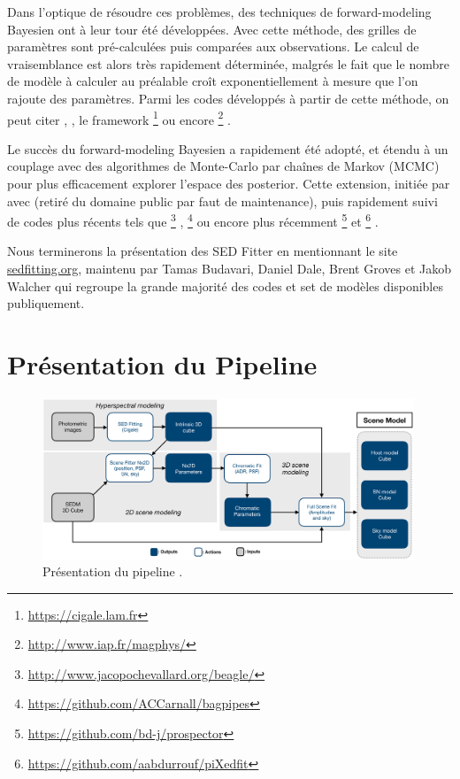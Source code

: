 \documentclass[../main/main.tex]{subfiles}
\begin{document}
Dans l'optique de résoudre ces problèmes, des techniques de forward-modeling
Bayesien ont à leur tour été développées. Avec cette méthode, des
grilles de paramètres sont pré-calculées puis comparées aux
observations. Le calcul de vraisemblance est alors très rapidement
déterminée, malgrés le fait que le nombre de modèle à calculer au
préalable croît exponentiellement à mesure que l'on rajoute des
paramètres. Parmi les codes développés à partir de cette méthode, on peut citer \citet{Kauffman2003}, \citet{Salim2007}, le
framework \footnote{\url{https://cigale.lam.fr}}
\citep{Burgarella2005, Noll2009, Boquien2019} ou encore
\footnote{\url{http://www.iap.fr/magphys/}}
\citep{Cunha2008MAGPHYS}.

Le succès du forward-modeling Bayesien a rapidement été adopté, et
étendu à un couplage avec des algorithmes de Monte-Carlo par chaînes de
Markov (MCMC) pour plus efficacement explorer l'espace des
posterior. Cette extension, initiée par \citet{Acquaviva2011} avec
 (retiré du domaine public par faut de maintenance), puis
rapidement suivi de codes plus récents tels que
\footnote{\url{http://www.jacopochevallard.org/beagle/}}
\citep{Chevallard2016},
\footnote{\url{https://github.com/ACCarnall/bagpipes}}
\citep{Carnall2018, Carnall2019} ou encore plus récemment
\footnote{\url{https://github.com/bd-j/prospector}}
\citep{JohnsonProspector} et
\footnote{\url{https://github.com/aabdurrouf/piXedfit}}
\citep{Abdurro'ufPixedfit}.

Nous terminerons la présentation des SED Fitter en mentionnant le site
\url{sedfitting.org}, maintenu par Tamas Budavari, Daniel Dale, Brent
Groves et Jakob Walcher qui regroupe la grande majorité des codes et set
de modèles disponibles publiquement.

\section{Présentation du Pipeline}\label{sec:pipeline}

\begin{figure}
  \centering
  \includegraphics[width=0.99\textwidth]{../figures/04_hypergal/softdaghypergal.png}
  \caption[Présentation du pipeline \hypergal]{Présentation du pipeline \hypergal.}
  \label{fig:softdaghypergal}
\end{figure}
\end{document}
